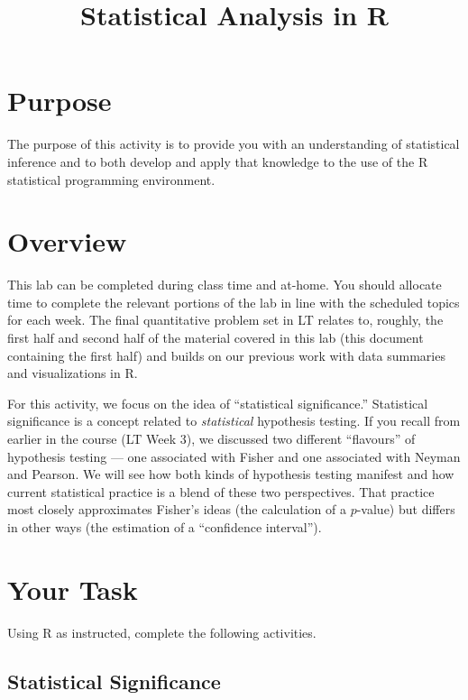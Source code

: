 \documentclass[a4paper,12pt]{article}
\title{Statistical Analysis in R}
\author{}
\date{}
\begin{document}
\vspace{-4em}

\maketitle

\vspace{-4em}

\section{Purpose}

The purpose of this activity is to provide you with an understanding of statistical inference and to both develop and apply that knowledge to the use of the R statistical programming environment.

\section{Overview}

This lab can be completed during class time and at-home. You should allocate time to complete the relevant portions of the lab in line with the scheduled topics for each week. The final quantitative problem set in LT relates to, roughly, the first half and second half of the material covered in this lab (this document containing the first half) and builds on our previous work with data summaries and visualizations in R.

For this activity, we focus on the idea of ``statistical significance.'' Statistical significance is a concept related to \textit{statistical} hypothesis testing. If you recall from earlier in the course (LT Week 3), we discussed two different ``flavours'' of hypothesis testing --- one associated with Fisher and one associated with Neyman and Pearson. We will see how both kinds of hypothesis testing manifest and how current statistical practice is a blend of these two perspectives. That practice most closely approximates Fisher's ideas (the calculation of a $p$-value) but differs in other ways (the estimation of a ``confidence interval'').

\section{Your Task}

Using R as instructed, complete the following activities.

\subsection{Statistical Significance}
\end{document}
